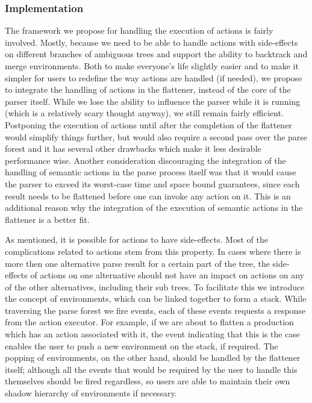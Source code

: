 \documentclass[a4paper,10pt]{article}
\begin{document}
\subsubsection{Implementation}
The framework we propose for handling the execution of actions is fairly involved. Mostly, because we need to be able to handle actions with side-effects on different branches of ambiguous trees and support the ability to backtrack and merge environments. Both to make everyone's life slightly easier and to make it simpler for users to redefine the way actions are handled (if needed), we propose to integrate the handling of actions in the flattener, instead of the core of the parser itself. While we lose the ability to influence the parser while it is running (which is a relatively scary thought anyway), we still remain fairly efficient. Postponing the execution of actions until after the completion of the flattener would simplify things further, but would also require a second pass over the parse forest and it has several other drawbacks which make it less desirable performance wise. Another consideration discouraging the integration of the handling of semantic actions in the parse process itself was that it would cause the parser to exceed its worst-case time and space bound guarantees, since each result needs to be flattened before one can invoke any action on it. This is an additional reason why the integration of the execution of semantic actions in the flattener is a better fit.

As mentioned, it is possible for actions to have side-effects. Most of the complications related to actions stem from this property. In cases where there is more then one alternative parse result for a certain part of the tree, the side-effects of actions on one alternative should not have an impact on actions on any of the other alternatives, including their sub trees. To facilitate this we introduce the concept of environments, which can be linked together to form a stack. While traversing the parse forest we fire events, each of these events requests a response from the action executor. For example, if we are about to flatten a production which has an action associated with it, the event indicating that this is the case enables the user to push a new environment on the stack, if required. The popping of environments, on the other hand, should be handled by the flattener itself; although all the events that would be required by the user to handle this themselves should be fired regardless, so users are able to maintain their own shadow hierarchy of environments if necessary.
\end{document}

